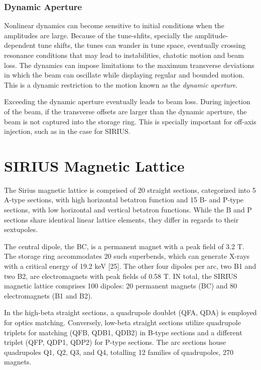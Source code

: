 \subsubsection{Dynamic Aperture}
    Nonlinear dynamics can become sensitive to initial conditions when the amplitudes are large. Because of the tune-shfits, specially the amplitude-dependent tune shifts, the tunes can wander in tune space, eventually crossing resonance conditions that may lead to instabilities, chatotic motion and beam loss. The dynamics can impose limitations to the maximum transverse deviations in which the beam can oscillate while displaying regular and bounded motion. This is a dynamic restriction to the motion known as the \textit{dynamic aperture}.

    Exceeding the dynamic aperture eventually leads to beam loss. During injection of the beam, if the transverse offsets are larger than the dynamic aperture, the beam is not captured into the storage ring. This is specially important for off-axis injection, such as in the case for SIRIUS.


\section{SIRIUS Magnetic Lattice}
The Sirius magnetic lattice is comprised of 20 straight sections, categorized into 5 A-type sections, with high horizontal betatron function and 15 B- and P-type sections, with low horizontal and vertical betatron functions. While the B and P sections share identical linear lattice elements, they differ in regards to their sextupoles.

The central dipole, the BC, is a permanent magnet with a peak field of 3.2 T. The storage ring accommodates 20 such superbends, which can generate X-rays with a critical energy of 19.2 keV [25]. The other four dipoles per arc, two B1 and two B2, are electromagnets with peak fields of 0.58 T. IN total, the SIRIUS magnetic lattice comprises 100 dipoles: 20 permanent magnets (BC) and 80 electromagnets (B1 and B2).

In the high-beta straight sections, a quadrupole doublet (QFA, QDA) is employed for optics matching. Conversely, low-beta straight sections utilize quadrupole triplets for matching (QFB, QDB1, QDB2) in B-type sections and a different triplet (QFP, QDP1, QDP2) for P-type sections. The arc sections house quadrupoles Q1, Q2, Q3, and Q4, totalling 12 families of quadrupoles, 270 magnets.

